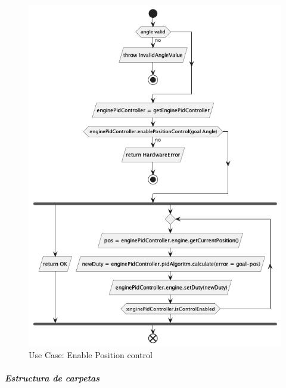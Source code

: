 \begin{figure}[H]
    \centering
    \includegraphics[height=0.7\textheight]{./part/Proyecto_ejecutivo/memoria_descriptiva/descripcionDelProyecto/control/uml/enablePositionControl}
    \caption{Use Case: Enable Position control}\label{fig:Use Case- Enable Position control}
\end{figure}

\subparagraph{Estructura de carpetas}







